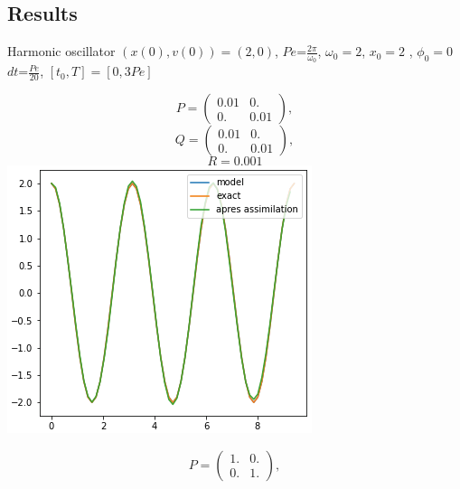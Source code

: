    \subsection{Results}

   \begin{frame}{Harmonic oscillator}
       \small
       $(x(0),v(0))=(2,0)$, \quad $Pe$=$\frac{2\pi}{\omega_0}$, \quad $\omega_0=2$, \quad $x_0=2$ \quad, $\phi_0=0$ \quad $dt$=$\frac{Pe}{20}$, \quad $[t_0,T]=[0,3Pe]$
       \begin{minipage}{.32\linewidth}
           \centering
           $$P=\begin{pmatrix}
               0.01 & 0. \\ 
               0. & 0.01 
           \end{pmatrix} ,$$
           $$Q=\begin{pmatrix}
               0.01 & 0. \\
               0. & 0.01 
           \end{pmatrix} ,$$
           $$R=0.001$$
           \includegraphics[width=\linewidth]{"images/enkf/oscillator1_b.png"}
       \end{minipage} \;
       \begin{minipage}{.32\linewidth}
           \centering
           $$P=\begin{pmatrix}
               1. & 0. \\
               0. & 1. 
           \end{pmatrix} ,$$

\end{minipage}
\end{frame}
